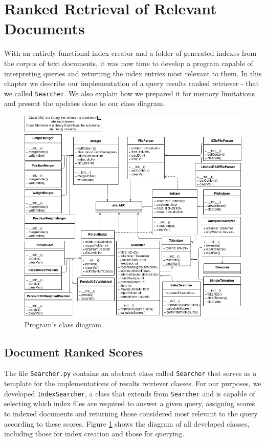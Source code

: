 \documentclass[12pt]{article}
\begin{document}
\section{Ranked Retrieval of Relevant Documents}

With an entirely functional index creator and a folder of generated indexes from
the corpus of text documents, it was now time to develop a program capable of
interpreting queries and returning the index entries most relevant to them.
In this chapter we describe our implementation of a query results ranked retriever
- that we called \texttt{Searcher}.
We also explain how we prepared it for memory limitations and present the 
updates done to our class diagram.

\begin{figure}[h!]
\centering
\includegraphics[width=0.95\linewidth]{ClassDiagram_assign3.png}
\caption{Program's class diagram.}
\label{fig:classdiagram}
\end{figure}

\newpage
\subsection{Document Ranked Scores}

The file \texttt{Searcher.py} contains an abstract class called \texttt{Searcher}
that serves as a template for the implementations of results retriever classes.
For our purposes, we developed \texttt{IndexSearcher}, a class that extends from
\texttt{Searcher} and is capable of selecting which index files are required to 
answer a given query, assigning scores to indexed documents and returning those 
considered most relevant to the query according to these scores.
Figure \ref{fig:classdiagram} shows the diagram of all developed classes, 
including those for index creation and those for querying.
\end{document}
